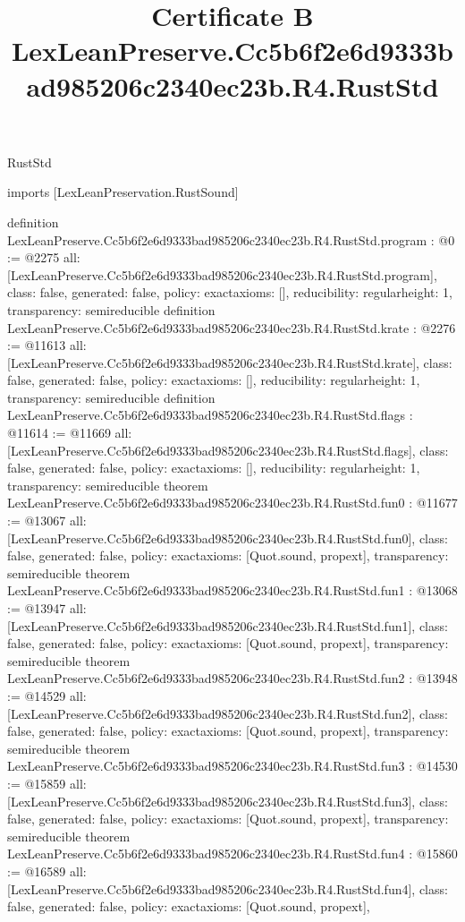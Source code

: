 \begin{lexlean}{RustStd}
\title{Certificate B LexLeanPreserve.Cc5b6f2e6d9333bad985206c2340ec23b.R4.RustStd}
\begin{coremodule}
imports [LexLeanPreservation.RustSound]

definition LexLeanPreserve.Cc5b6f2e6d9333bad985206c2340ec23b.R4.RustStd.program : @0 := @2275 {
  all: [LexLeanPreserve.Cc5b6f2e6d9333bad985206c2340ec23b.R4.RustStd.program],
  class: false,
  generated: false,
  policy: exact{axioms: []},
  reducibility: regular{height: 1},
  transparency: semireducible
}
definition LexLeanPreserve.Cc5b6f2e6d9333bad985206c2340ec23b.R4.RustStd.krate : @2276 := @11613 {
  all: [LexLeanPreserve.Cc5b6f2e6d9333bad985206c2340ec23b.R4.RustStd.krate],
  class: false,
  generated: false,
  policy: exact{axioms: []},
  reducibility: regular{height: 1},
  transparency: semireducible
}
definition LexLeanPreserve.Cc5b6f2e6d9333bad985206c2340ec23b.R4.RustStd.flags : @11614 := @11669 {
  all: [LexLeanPreserve.Cc5b6f2e6d9333bad985206c2340ec23b.R4.RustStd.flags],
  class: false,
  generated: false,
  policy: exact{axioms: []},
  reducibility: regular{height: 1},
  transparency: semireducible
}
theorem LexLeanPreserve.Cc5b6f2e6d9333bad985206c2340ec23b.R4.RustStd.fun0 : @11677 := @13067 {
  all: [LexLeanPreserve.Cc5b6f2e6d9333bad985206c2340ec23b.R4.RustStd.fun0],
  class: false,
  generated: false,
  policy: exact{axioms: [Quot.sound, propext]},
  transparency: semireducible
}
theorem LexLeanPreserve.Cc5b6f2e6d9333bad985206c2340ec23b.R4.RustStd.fun1 : @13068 := @13947 {
  all: [LexLeanPreserve.Cc5b6f2e6d9333bad985206c2340ec23b.R4.RustStd.fun1],
  class: false,
  generated: false,
  policy: exact{axioms: [Quot.sound, propext]},
  transparency: semireducible
}
theorem LexLeanPreserve.Cc5b6f2e6d9333bad985206c2340ec23b.R4.RustStd.fun2 : @13948 := @14529 {
  all: [LexLeanPreserve.Cc5b6f2e6d9333bad985206c2340ec23b.R4.RustStd.fun2],
  class: false,
  generated: false,
  policy: exact{axioms: [Quot.sound, propext]},
  transparency: semireducible
}
theorem LexLeanPreserve.Cc5b6f2e6d9333bad985206c2340ec23b.R4.RustStd.fun3 : @14530 := @15859 {
  all: [LexLeanPreserve.Cc5b6f2e6d9333bad985206c2340ec23b.R4.RustStd.fun3],
  class: false,
  generated: false,
  policy: exact{axioms: [Quot.sound, propext]},
  transparency: semireducible
}
theorem LexLeanPreserve.Cc5b6f2e6d9333bad985206c2340ec23b.R4.RustStd.fun4 : @15860 := @16589 {
  all: [LexLeanPreserve.Cc5b6f2e6d9333bad985206c2340ec23b.R4.RustStd.fun4],
  class: false,
  generated: false,
  policy: exact{axioms: [Quot.sound, propext]},
}
\end{coremodule}
\end{lexlean}
